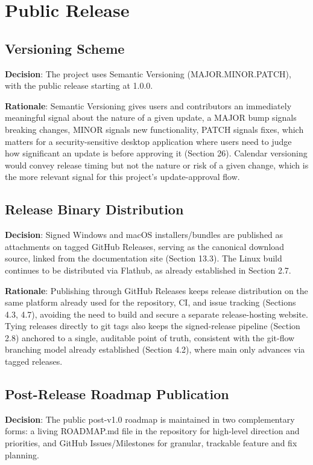 \chapter{Public Release}

\section{Versioning Scheme}
\textbf{Decision}: The project uses Semantic Versioning (MAJOR.MINOR.PATCH), with the public release starting at 1.0.0.

\textbf{Rationale}: Semantic Versioning gives users and contributors an immediately meaningful signal about the nature of a given update, a MAJOR bump signals breaking changes, MINOR signals new functionality, PATCH signals fixes, which matters for a security-sensitive desktop application where users need to judge how significant an update is before approving it (Section 26). Calendar versioning would convey release timing but not the nature or risk of a given change, which is the more relevant signal for this project's update-approval flow.
\section{Release Binary Distribution}
\textbf{Decision}: Signed Windows and macOS installers/bundles are published as attachments on tagged GitHub Releases, serving as the canonical download source, linked from the documentation site (Section 13.3). The Linux build continues to be distributed via Flathub, as already established in Section 2.7.

\textbf{Rationale}: Publishing through GitHub Releases keeps release distribution on the same platform already used for the repository, CI, and issue tracking (Sections 4.3, 4.7), avoiding the need to build and secure a separate release-hosting website. Tying releases directly to git tags also keeps the signed-release pipeline (Section 2.8) anchored to a single, auditable point of truth, consistent with the git-flow branching model already established (Section 4.2), where main only advances via tagged releases.
\section{Post-Release Roadmap Publication}
\textbf{Decision}: The public post-v1.0 roadmap is maintained in two complementary forms: a living ROADMAP.md file in the repository for high-level direction and priorities, and GitHub Issues/Milestones for granular, trackable feature and fix planning.

